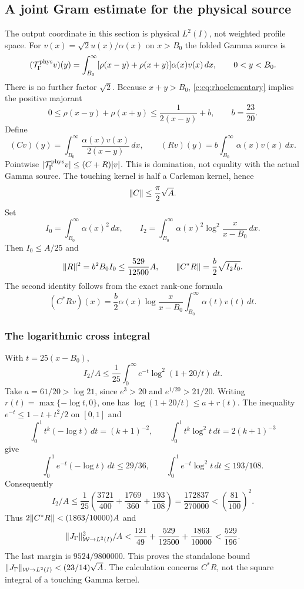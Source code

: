 \documentclass[11pt,a4paper]{article}
\numberwithin{equation}{section}
\theoremstyle{definition}\newtheorem{definition}[theorem]{Definition}
\theoremstyle{remark}\newtheorem{remark}[theorem]{Remark}
\begin{document}
\subsection{A joint Gram estimate for the physical source}\label{c:sec:joint}
The output coordinate in this section is physical $L^2(I)$, not weighted profile space.
For $v(x)=\sqrt2u(x)/\alpha(x)$ on $x>{B_0}$ the folded Gamma source is
\[
 (\mathcal T_\Gamma^{\rm phys}v)(y)=\int_{B_0}^\infty
 [\rho(x-y)+\rho(x+y)]\alpha(x)v(x)\,dx,\qquad0<y<{B_0}.
\]
There is no further factor $\sqrt2$.
Because $x+y>{B_0}$, \eqref{c:eq:rhoelementary} implies the positive majorant
\[
 0\le\rho(x-y)+\rho(x+y)\le\frac1{2(x-y)}+b,\qquad b=\frac{23}{20}.
\]
Define
\[
 (Cv)(y)=\int_{B_0}^\infty\frac{\alpha(x)v(x)}{2(x-y)}\,dx,\qquad
 (Rv)(y)=b\int_{B_0}^\infty\alpha(x)v(x)\,dx.
\]
Pointwise $|\mathcal T_\Gamma^{\rm phys}v|\le(C+R)|v|$.
This is domination, not equality with the actual Gamma source.
The touching kernel is half a Carleman kernel, hence
\[
 \lVert C\rVert\le\frac\pi2\sqrt A.
\]
Set
\[
 I_0=\int_{B_0}^\infty\alpha(x)^2\,dx,\qquad
 I_2=\int_{B_0}^\infty\alpha(x)^2\log^2\frac{x}{x-{B_0}}\,dx.
\]
Then $I_0\le A/25$ and
\begin{equation}\label{c:eq:regulargram}
 \lVert R\rVert^2=b^2B_0I_0\le\frac{529}{12500}A,\qquad
 \lVert C^*R\rVert=\frac b2\sqrt{I_2I_0}.
\end{equation}
The second identity follows from the exact rank-one formula
\[
 (C^*Rv)(x)=\frac b2\alpha(x)\log\frac{x}{x-{B_0}}
                  \int_{B_0}^\infty\alpha(t)v(t)\,dt.
\]

\subsubsection{The logarithmic cross integral}
With $t=25(x-{B_0})$,
\[
 I_2/A\le\frac1{25}\int_0^\infty e^{-t}\log^2(1+20/t)\,dt.
\]
Take $a=61/20>\log21$, since $e^3>20$ and $e^{1/20}>21/20$.
Writing $r(t)=\max\{-\log t,0\}$, one has
$\log(1+20/t)\le a+r(t)$.
The inequality $e^{-t}\le1-t+t^2/2$ on $[0,1]$ and
\[
 \int_0^1t^k(-\log t)\,dt=(k+1)^{-2},\qquad
 \int_0^1t^k\log^2t\,dt=2(k+1)^{-3}
\]
give
\[
 \int_0^1e^{-t}(-\log t)\,dt\le29/36,\qquad
 \int_0^1e^{-t}\log^2t\,dt\le193/108.
\]
Consequently
\begin{equation}\label{c:eq:I2}
 I_2/A\le\frac1{25}\left(\frac{3721}{400}+
       \frac{1769}{360}+\frac{193}{108}\right)
 =\frac{172837}{270000}<\left(\frac{81}{100}\right)^2.
\end{equation}
Thus $2\lVert C^*R\rVert<(1863/10000)A$ and
\begin{equation}\label{c:eq:gammajoint}
 \lVert J_\Gamma\rVert_{\mathcal W\to L^2(I)}^2/A
 <\frac{121}{49}+\frac{529}{12500}+\frac{1863}{10000}
 <\frac{529}{196}.
\end{equation}
The last margin is $9524/9800000$.
This proves the standalone bound
$\lVert J_\Gamma\rVert_{\mathcal W\to L^2(I)}<(23/14)\sqrt A$.
The calculation concerns $C^*R$, not the square integral of a touching Gamma kernel.
\end{document}

